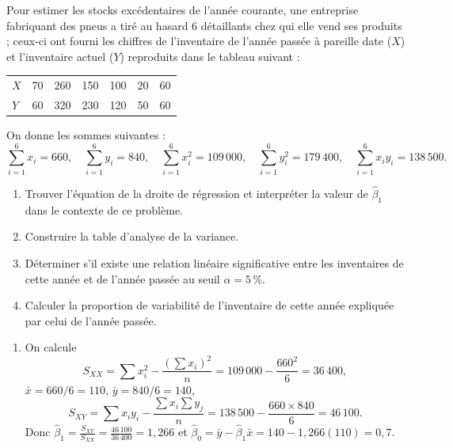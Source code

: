 
\begin{exercice}
Pour estimer les stocks excédentaires de l'année courante, une entreprise fabriquant des
pneus a tiré au hasard 6 détaillants chez qui elle vend ses produits ; ceux-ci ont fourni
les chiffres de l'inventaire de l'année passée à pareille date ($X$) et l'inventaire actuel
($Y$) reproduits dans le tableau suivant :
\begin{center}
\begin{tabular}{l*{6}{c}}
  \toprule
  $X$ & 70 & 260 & 150 & 100 & 20 & 60\\
  $Y$ & 60 & 320 & 230 & 120 & 50 & 60\\
  \bottomrule
\end{tabular}
\end{center}
On donne les sommes suivantes :
\[
  \sum_{i=1}^{6}x_i=660,\quad \sum_{i=1}^{6}y_i=840,\quad
  \sum_{i=1}^{6}x_i^2=109\,000,\quad \sum_{i=1}^{6}y_i^2=179\,400,\quad
  \sum_{i=1}^{6}x_iy_i=138\,500.
\]
\begin{enumerate}[label=(\alph*)]
  \item Trouver l'équation de la droite de régression et interpréter la valeur de
  $\hat\beta_1$ dans le contexte de ce problème.
  \item Construire la table d'analyse de la variance.
  \item Déterminer s'il existe une relation linéaire significative entre les inventaires de
  cette année et de l'année passée au seuil $\alpha=5\,\%$.
  \item Calculer la proportion de variabilité de l'inventaire de cette année expliquée par
  celui de l'année passée.
\end{enumerate}
\begin{solution}
\begin{enumerate}[label=(\alph*)]
  \item On calcule
  \[
    S_{XX}=\sum x_i^2-\frac{\left(\sum x_i\right)^2}{n}=109\,000-\frac{660^2}{6}=36\,400,
  \]
  $\bar x=660/6=110$, $\bar y=840/6=140$,
  \[
    S_{XY}=\sum x_iy_i-\frac{\sum x_i\sum y_j}{n}=138\,500-\frac{660\times 840}{6}=46\,100.
  \]
  Donc $\hat\beta_1=\frac{S_{XY}}{S_{XX}}=\frac{46\,100}{36\,400}=1,266$ et
  $\hat\beta_0=\bar y-\hat\beta_1\bar x=140-1,266(110)=0,7$.


\end{enumerate}
\end{solution}
\end{exercice}
